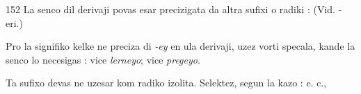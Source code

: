 \begin{VUpage}[156]{152}
La senco dil derivaji povas esar precizigata da altra sufixi\nl
o radiki :  (Vid.\nl
-eri.)

Pro la signifiko kelke ne preciza di \textit{-ey} en ula derivaji,\nl
uzez vorti specala, kande la senco lo necesigas : \nl
{} vice \textit{lerneyo}; \nl
{} vice \textit{pregeyo}.

Ta sufixo devas ne uzesar kom radiko izolita. Selektez,\nl
segun la kazo :  e. c.,\parplein
\end{VUpage}

